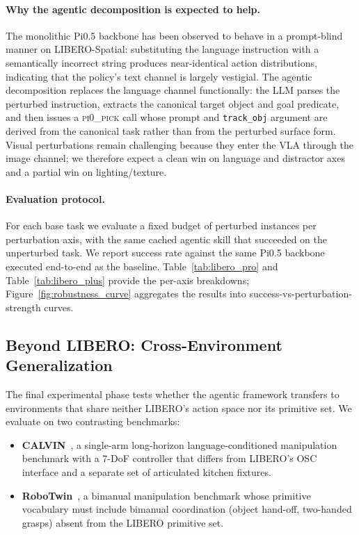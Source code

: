 \documentclass{article}
\begin{document}
	\paragraph{Why the agentic decomposition is expected to help.}
	The monolithic Pi0.5 backbone has been observed to behave in a
	prompt-blind manner on LIBERO-Spatial: substituting the language
	instruction with a semantically incorrect string produces
	near-identical action distributions, indicating that the
	policy's text channel is largely vestigial.
	The agentic decomposition replaces the language channel
	functionally: the LLM parses the perturbed instruction, extracts
	the canonical target object and goal predicate, and then issues
	a \textsc{pi0\_pick} call whose prompt and \texttt{track\_obj}
	argument are derived from the canonical task rather than from
	the perturbed surface form. Visual perturbations remain
	challenging because they enter the VLA through the image
	channel; we therefore expect a clean win on language and
	distractor axes and a partial win on lighting/texture.

	\paragraph{Evaluation protocol.} For each base task we evaluate
	a fixed budget of perturbed instances per perturbation axis, with
	the same cached agentic skill that succeeded on the unperturbed
	task. We report success rate against the same Pi0.5 backbone
	executed end-to-end as the baseline. Table~\ref{tab:libero_pro}
	and Table~\ref{tab:libero_plus} provide the per-axis
	breakdowns; Figure~\ref{fig:robustness_curve} aggregates the
	results into success-vs-perturbation-strength curves.

\subsection{Beyond LIBERO: Cross-Environment Generalization}
\label{sec:exp:transfer}

	The final experimental phase tests whether the agentic framework
	transfers to environments that share neither LIBERO's action
	space nor its primitive set. We evaluate on two contrasting
	benchmarks:

	\begin{itemize}
	\item \textbf{CALVIN}~\citep{Gauss1857}, a single-arm
	long-horizon language-conditioned manipulation benchmark with a
	7-DoF controller that differs from LIBERO's OSC interface and a
	separate set of articulated kitchen fixtures.
	\item \textbf{RoboTwin}~\citep{Lagrange1788}, a bimanual
	manipulation benchmark whose primitive vocabulary must include
	bimanual coordination (object hand-off, two-handed grasps)
	absent from the LIBERO primitive set.
	\end{itemize}
\end{document}
